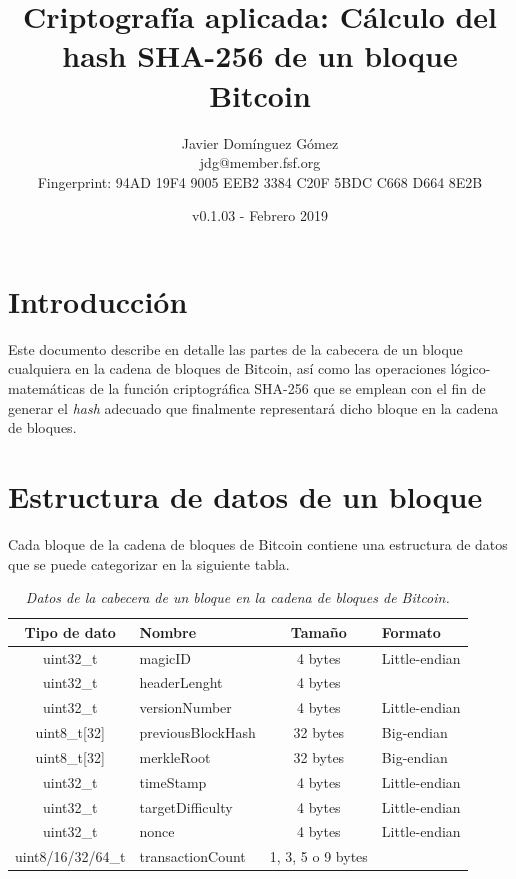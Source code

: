 \documentclass{article}
\title{\textbf{Criptografía aplicada: Cálculo del hash SHA-256 de un bloque Bitcoin}}
\author{Javier Domínguez Gómez \\
\small{jdg@member.fsf.org} \\
\small{Fingerprint: 94AD 19F4 9005 EEB2 3384 C20F 5BDC C668 D664 8E2B}}
\date{v0.1.03 - Febrero 2019}
\begin{document}
\maketitle

\tableofcontents{}

\section{Introducción}
    Este documento describe en detalle las partes de la cabecera de un bloque cualquiera en la cadena de bloques de Bitcoin, así como las operaciones lógico-matemáticas de la función criptográfica SHA-256 que se emplean con el fin de generar el \textit{hash} adecuado que finalmente representará dicho bloque en la cadena de bloques.

\section{Estructura de datos de un bloque}
    \vspace{3mm}
    Cada bloque de la cadena de bloques de Bitcoin contiene una estructura de datos que se puede categorizar en la siguiente tabla.
    \begin{table}[H]
    \centering
    \begin{tabular}{| c | l | c | l |} 
        \hline
        Tipo de dato & Nombre & Tamaño & Formato \\
        \hline
        uint32\_t & magicID & 4 bytes & Little-endian \\
        \hline
        uint32\_t & headerLenght & 4 bytes &  \\
        \hline
        uint32\_t & versionNumber & 4 bytes & Little-endian \\
        \hline
        uint8\_t[32] & previousBlockHash & 32 bytes & Big-endian \\
        \hline
        uint8\_t[32] & merkleRoot & 32 bytes & Big-endian \\
        \hline
        uint32\_t & timeStamp & 4 bytes & Little-endian \\
        \hline
        uint32\_t & targetDifficulty & 4 bytes & Little-endian \\
        \hline
        uint32\_t & nonce & 4 bytes & Little-endian \\
        \hline
        uint8/16/32/64\_t & transactionCount & 1, 3, 5 o 9 bytes &  \\
        \hline
    \end{tabular}
    \caption{\textit{Datos de la cabecera de un bloque en la cadena de bloques de Bitcoin.}}
    \label{table:0}
    \end{table}
    
\end{document}
